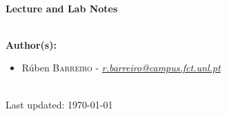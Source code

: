 \documentclass[12pt]{article}
\begin{document}
\begin{titlepage}
    
    \HRule \\[0.8cm]
        { \huge \bfseries Lecture and Lab Notes}\\[0.4cm] %
    \HRule \\[1.5cm]
     
    
    \begin{minipage}{0.75\textwidth}
    
        \begin{flushleft} \large
            \textbf{Author(s):}\\
            \begin{itemize}
                \vspace{-0.1cm}
                \item \normalsize{Rúben \textsc{Barreiro} - \href{mailto:r.barreiro@campus.fct.unl.pt}{\emph{r.barreiro@campus.fct.unl.pt}}}
            \end{itemize}
        \end{flushleft}
    
    \end{minipage}\\[2cm]
    
    
    
    {\large{Last updated: \today}}\\[2cm] %
    
    \vfill %

    \end{titlepage}

    \newpage
    
    
    
    
    
    
    
    
    
    
    
\end{document}
